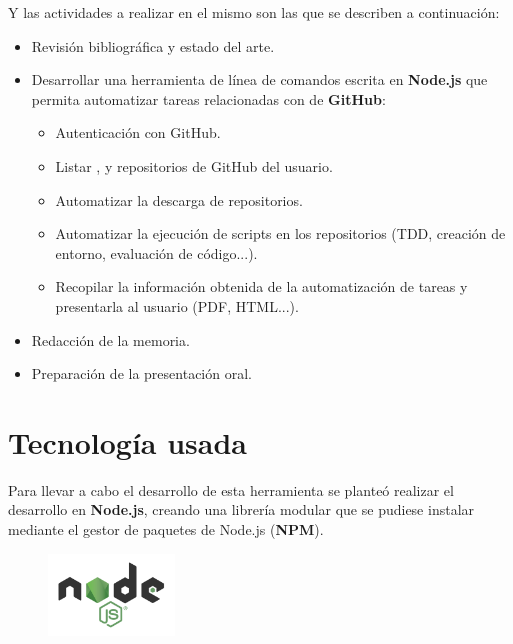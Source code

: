 Y las actividades a realizar en el mismo son las que se describen a continuación:
\begin{itemize}
  \item Revisión bibliográfica y estado del arte.
  \item Desarrollar una herramienta de línea de comandos escrita en {\bfseries Node.js} que permita automatizar tareas relacionadas con \ceit{\ref{apend1:repositorio}} de {\bfseries GitHub}:
  \begin{itemize}
    \item Autenticación con GitHub.
    \item Listar \ceit{\ref{apend1:organizacion}}, \ceit{\ref{apend1:asignaciones}} y repositorios de GitHub del usuario.
    \item Automatizar la descarga de repositorios.
    \item Automatizar la ejecución de scripts en los repositorios (TDD, creación de entorno, evaluación de código...).
    \item Recopilar la información obtenida de la automatización de tareas y presentarla al usuario (PDF, HTML...).
  \end{itemize}
  \item Redacción de la memoria.
  \item Preparación de la presentación oral.
\end{itemize}
\newpage

\section{Tecnología usada}
\label{1:sec:3}
 
Para llevar a cabo el desarrollo de esta herramienta se planteó realizar el desarrollo en {\bfseries Node.js}, creando una librería modular que se pudiese instalar mediante el gestor de paquetes de Node.js ({\bfseries NPM}).

\begin{figure}[H]
\begin{center}
\includegraphics[width=0.3\textwidth]{images/nodejs-logo}
\end{center}
\end{figure}

